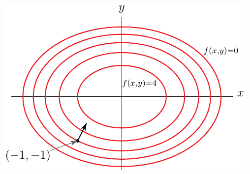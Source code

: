 \begin{eg}
\begin{efig}
\begin{center}
   \includegraphics{dderivC.pdf}
\end{center}
\end{efig}
\end{eg}

